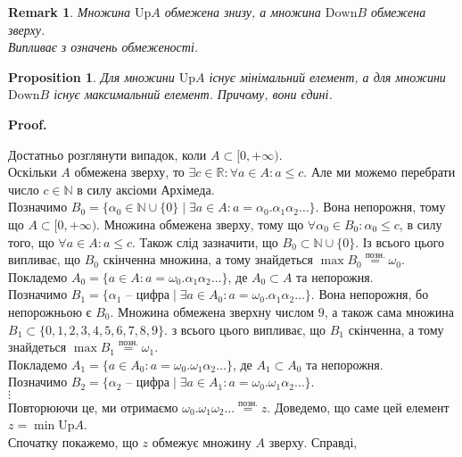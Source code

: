 \documentclass[a4paper, 14pt]{article}
\makeatletter
\def\qed{$\blacksquare$}
\theoremstyle{theoremdd}
\theoremstyle{theoremdd}
\theoremstyle{theoremdd}
\theoremstyle{theoremdd}
\theoremstyle{theoremdd}
\newtheorem{proposition}[theorem]{Proposition}
\theoremstyle{theoremdd}
\newtheorem{remark}[theorem]{Remark}
\theoremstyle{theoremdd}
\theoremstyle{theoremdd}
\renewenvironment{proof}[1][Proof.\\]{\par
\pushQED{\hfill \qed}%
\normalfont \topsep6\p@\@plus6\p@\relax
\trivlist
\item\relax
{\bfseries
#1\@addpunct{.}}\hspace\labelsep\ignorespaces
}{%
\popQED\endtrivlist\@endpefalse
}
\makeatother
\begin{document}
	\begin{remark}
	Множина $\text{Up}A$ обмежена знизу, а множина $\text{Down}B$ обмежена зверху.\\
	\textit{Випливає з означень обмеженості.}
	\end{remark}
	
	\begin{proposition}
	Для множини $\text{Up}A$ існує мінімальний елемент, а для множини $\text{Down}B$ існує максимальний елемент. Причому, вони єдині.
	\end{proposition}
	
	\begin{proof}
	Достатньо розглянути випадок, коли $A \subset [0,+\infty)$.\\
	Оскільки $A$ обмежена зверху, то $\exists c \in \mathbb{R}: \forall a \in A: a \leq c$. Але ми можемо перебрати число $c \in \mathbb{N}$ в силу аксіоми Архімеда.\\
	Позначимо $B_0 = \{ \alpha_0 \in \mathbb{N} \cup \{0\} \mid \exists a \in A: a = \alpha_0.\alpha_1\alpha_2 \dots \}$. Вона непорожня, тому що $A \subset [0,+\infty)$. Множина обмежена зверху, тому що $\forall \alpha_0 \in B_0: \alpha_0 \leq c$, в силу того, що $\forall a \in A: a \leq c$. Також слід зазначити, що $B_0 \subset \mathbb{N} \cup \{0\}$. Із всього цього випливає, що $B_0$ скінченна множина, а тому знайдеться $\max B_0 \overset{\text{позн.}}{=} \omega_0$.\\
	Покладемо $A_0 = \{a \in A: a = \omega_0.\alpha_1 \alpha_2 \dots\}$, де $A_0 \subset A$ та непорожня.\\
	Позначимо $B_1 = \{ \alpha_1 \text{ -- цифра} \mid \exists a \in A_0: a = \omega_0.\alpha_1 \alpha_2 \dots \}$. Вона непорожня, бо непорожньою є $B_0$. Множина обмежена зверхну числом $9$, а також сама множина $B_1 \subset \{0,1,2,3,4,5,6,7,8,9\}$. з всього цього випливає, що $B_1$ скінченна, а тому знайдеться $\max B_1 \overset{\text{позн.}}{=} \omega_1$.\\
	Покладемо $A_1 = \{a \in A_0: a = \omega_0.\omega_1 \alpha_2 \dots\}$, де $A_1 \subset A_0$ та непорожня.\\
	Позначимо $B_2 = \{ \alpha_2 \text{ -- цифра} \mid \exists a \in A_1: a = \omega_0.\omega_1\alpha_2 \dots \}$.\\
	$\vdots$\\
	Повторюючи це, ми отримаємо $\omega_0.\omega_1\omega_2\dots \overset{\text{позн.}}{=} z$. Доведемо, що саме цей елемент $z = \min \text{Up} A$.\\
	Спочатку покажемо, що $z$ обмежує множину $A$ зверху. Справді,\\

\end{proof}
\end{document}

